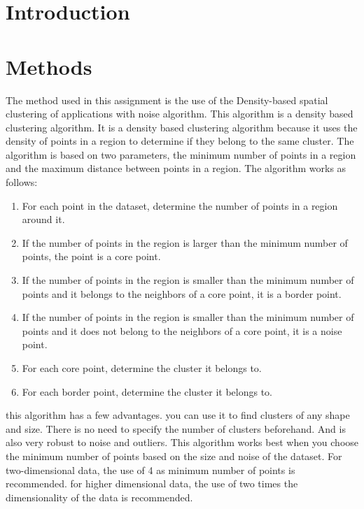 \documentclass[twoside, a4paper, fleqn, reqno]{article}
\begin{document}
\maketitle

\section{Introduction}

\section{Methods}

The method used in this assignment is the use of the Density-based spatial clustering of applications with noise algorithm. 
This algorithm is a density based clustering algorithm. 
It is a density based clustering algorithm because it uses the density of points in a region to determine if they belong to the same cluster. 
The algorithm is based on two parameters, the minimum number of points in a region and the maximum distance between points in a region. 
The algorithm works as follows:
\begin{enumerate}
	\item For each point in the dataset, determine the number of points in a region around it.
	\item If the number of points in the region is larger than the minimum number of points, the point is a core point.
	\item If the number of points in the region is smaller than the minimum number of points and it belongs to the neighbors of a core point, it is a border point.
	\item If the number of points in the region is smaller than the minimum number of points and it does not belong to the neighbors of a core point, it is a noise point.
	\item For each core point, determine the cluster it belongs to.
	\item For each border point, determine the cluster it belongs to.
\end{enumerate}
this algorithm has a few advantages. you can use it to find clusters of any shape and size.
There is no need to specify the number of clusters beforehand. And is also very robust to noise and outliers.
This algorithm works best when you choose the minimum number of points based on the size and noise of the dataset.
For two-dimensional data, the use of 4 as minimum number of points is recommended.
for higher dimensional data, the use of two times the dimensionality of the data is recommended.
\end{document}
